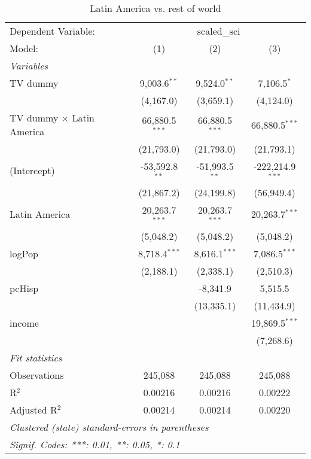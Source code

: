 \begin{table}[htbp]
\centering
\caption{Latin America vs. rest of world}
\begin{tabular}{lccc}
\tabularnewline\midrule\midrule
Dependent Variable:&\multicolumn{3}{c}{scaled\_sci}\\
Model:&(1) & (2) & (3)\\
\midrule \emph{Variables}&   &   &  \\
TV dummy & 9,003.6$^{**}$ & 9,524.0$^{**}$ & 7,106.5$^{*}$\\
  &(4,167.0) & (3,659.1) & (4,124.0)\\
TV dummy $\times$ Latin America & 66,880.5$^{***}$ & 66,880.5$^{***}$ & 66,880.5$^{***}$\\
  &(21,793.0) & (21,793.0) & (21,793.1)\\
(Intercept) & -53,592.8$^{**}$ & -51,993.5$^{**}$ & -222,214.9$^{***}$\\
  &(21,867.2) & (24,199.8) & (56,949.4)\\
Latin America & 20,263.7$^{***}$ & 20,263.7$^{***}$ & 20,263.7$^{***}$\\
  &(5,048.2) & (5,048.2) & (5,048.2)\\
logPop & 8,718.4$^{***}$ & 8,616.1$^{***}$ & 7,086.5$^{***}$\\
  &(2,188.1) & (2,338.1) & (2,510.3)\\
pcHisp &    & -8,341.9 & 5,515.5\\
  &   & (13,335.1) & (11,434.9)\\
income &    &    & 19,869.5$^{***}$\\
  &   &    & (7,268.6)\\
\midrule \emph{Fit statistics}&  & & \\
Observations & 245,088&245,088&245,088\\
R$^2$ & 0.00216&0.00216&0.00222\\
Adjusted R$^2$ & 0.00214&0.00214&0.00220\\
\midrule\midrule\multicolumn{4}{l}{\emph{Clustered (state) standard-errors in parentheses}}\\
\multicolumn{4}{l}{\emph{Signif. Codes: ***: 0.01, **: 0.05, *: 0.1}}\\
\end{tabular}
\end{table}

